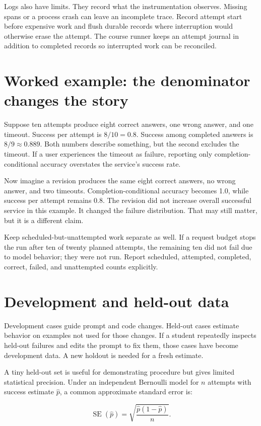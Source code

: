 Logs also have limits. They record what the instrumentation observes. Missing spans or a process crash can leave an incomplete trace. Record attempt start before expensive work and flush durable records where interruption would otherwise erase the attempt. The course runner keeps an attempt journal in addition to completed records so interrupted work can be reconciled.

\section{Worked example: the denominator changes the story}
Suppose ten attempts produce eight correct answers, one wrong answer, and one timeout. Success per attempt is \(8/10=0.8\). Success among completed answers is \(8/9\approx0.889\). Both numbers describe something, but the second excludes the timeout. If a user experiences the timeout as failure, reporting only completion-conditional accuracy overstates the service's success rate.

Now imagine a revision produces the same eight correct answers, no wrong answer, and two timeouts. Completion-conditional accuracy becomes 1.0, while success per attempt remains 0.8. The revision did not increase overall successful service in this example. It changed the failure distribution. That may still matter, but it is a different claim.

Keep scheduled-but-unattempted work separate as well. If a request budget stops the run after ten of twenty planned attempts, the remaining ten did not fail due to model behavior; they were not run. Report scheduled, attempted, completed, correct, failed, and unattempted counts explicitly.

\section{Development and held-out data}
Development cases guide prompt and code changes. Held-out cases estimate behavior on examples not used for those changes. If a student repeatedly inspects held-out failures and edits the prompt to fix them, those cases have become development data. A new holdout is needed for a fresh estimate.

A tiny held-out set is useful for demonstrating procedure but gives limited statistical precision. Under an independent Bernoulli model for \(n\) attempts with success estimate \(\hat p\), a common approximate standard error is:

\begin{equation}
\operatorname{SE}(\hat p)=\sqrt{\frac{\hat p(1-\hat p)}{n}}.
\end{equation}

